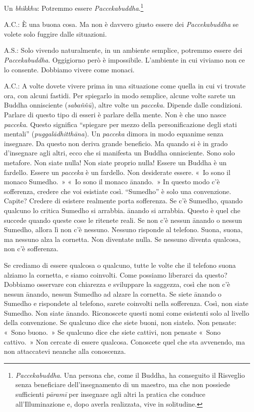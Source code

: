 Un \emph{bhikkhu}: Potremmo essere \emph{Paccekabuddha}.\footnote{\emph{Paccekabuddha}.
  Una persona che, come il Buddha, ha conseguito il Risveglio senza
  beneficiare dell'insegnamento di un maestro, ma che non possiede
  sufficienti \emph{pāramī} per insegnare agli altri la pratica che
  conduce all'Illuminazione e, dopo averla realizzata, vive in
  solitudine.}

A.C.: È una buona cosa. Ma non è davvero giusto essere dei
\emph{Paccekabuddha} se volete solo fuggire dalle situazioni.

A.S.: Solo vivendo naturalmente, in un ambiente semplice, potremmo
essere dei \emph{Paccekabuddha}. Oggigiorno però è impossibile.
L'ambiente in cui viviamo non ce lo consente. Dobbiamo vivere come
monaci.

A.C.: A volte dovete vivere prima in una situazione come quella in cui
vi trovate ora, con alcuni fastidi. Per spiegarlo in modo semplice,
alcune volte sarete un Buddha onnisciente (\emph{sabaññū}), altre volte
un \emph{pacceka}. Dipende dalle condizioni. Parlare di questo tipo di
esseri è parlare della mente. Non è che uno nasce \emph{pacceka}. Questo
significa ``spiegare per mezzo della personificazione degli stati
mentali'' (\emph{puggalādhitthāna}). Un \emph{pacceka} dimora in modo
equanime senza insegnare. Da questo non deriva grande beneficio. Ma
quando si è in grado d'insegnare agli altri, ecco che si manifesta un
Buddha onnisciente. Sono solo metafore. Non siate nulla! Non siate
proprio nulla! Essere un Buddha è un fardello. Essere un \emph{pacceka}
è un fardello. Non desiderate essere. «~Io sono il monaco Sumedho.~»
«~Io sono il monaco ānando.~» In questo modo c'è sofferenza, credere che
voi esistiate così. ``Sumedho'' è solo una convenzione. Capite? Credere
di esistere realmente porta sofferenza. Se c'è Sumedho, quando qualcuno
lo critica Sumedho si arrabbia. ānando si arrabbia. Questo è quel che
succede quando queste cose le ritenete reali. Se non c'è nessun ānando o
nessun Sumedho, allora lì non c'è nessuno. Nessuno risponde al telefono.
Suona, suona, ma nessuno alza la cornetta. Non diventate nulla. Se
nessuno diventa qualcosa, non c'è sofferenza.

Se crediamo di essere qualcosa o qualcuno, tutte le volte che il
telefono suona alziamo la cornetta, e siamo coinvolti. Come possiamo
liberarci da questo? Dobbiamo osservare con chiarezza e sviluppare la
saggezza, così che non c'è nessun ānando, nessun Sumedho ad alzare la
cornetta. Se siete ānando o Sumedho e rispondete al telefono, sarete
coinvolti nella sofferenza. Così, non siate Sumedho. Non siate ānando.
Riconoscete questi nomi come esistenti solo al livello della
convenzione. Se qualcuno dice che siete buoni, non siatelo. Non pensate:
«~Sono buono.~» Se qualcuno dice che siete cattivi, non pensate «~Sono
cattivo.~» Non cercate di essere qualcosa. Conoscete quel che sta
avvenendo, ma non attaccatevi neanche alla conoscenza.

